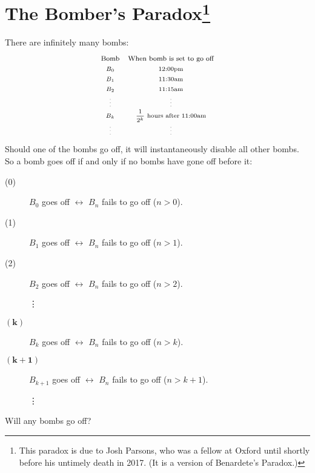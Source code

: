 \documentclass[12pt]{extarticle}
\begin{document}
\section{The Bomber's Paradox\footnote{This paradox is due to Josh Parsons, who was a fellow at Oxford until shortly before his untimely death in 2017. (It is a version of Benardete's Paradox.)
} {\normalsize {}}}


There are infinitely many bombs:
\[
\begin{array}{cc}
\text{\footnotesize Bomb} & \text{\footnotesize When bomb is set to go off} \\
\text{\scriptsize $B_0$} & \text{\scriptsize 12:00pm} \\
\text{\scriptsize $B_1$} & \text{\scriptsize 11:30am} \\
\text{\scriptsize $B_2$} & \text{\scriptsize 11:15am} \\
\text{\tiny\vdots} & \text{\tiny\vdots}\\
\text{\scriptsize $B_k$} & \text{\scriptsize \(\dfrac{1}{2^k}\) hours after 11:00am} \\
\text{\tiny\vdots} & \text{\tiny\vdots}\\
\end{array}
\]
Should one of the bombs go off, it will instantaneously disable all other bombs. So a bomb goes off if and only if no bombs have gone off before it:
\begin{description}

\item[(0)] \(B_0\) goes off $\leftrightarrow$ \(B_n\)  fails to go off ($n > 0$).
\item[(1)] \(B_1\) goes off $\leftrightarrow$ \(B_n\)  fails to go off ($n > 1$).
\item[(2)] \(B_2\) goes off $\leftrightarrow$ \(B_n\) fails to go off ($n > 2$).



\hspace{5mm }\vdots

\item[$\bm{(k)}$] \(B_k\) goes off $\leftrightarrow$ \(B_n\) fails to go off ($n > k$).
\item[$\bm{(k+1)}$] \(B_{k+1}\) goes off $\leftrightarrow$ \(B_n\) fails to go off ($n > k+1$).

\hspace{5mm }\vdots

\end{description}
Will any bombs go off?
\end{document}
